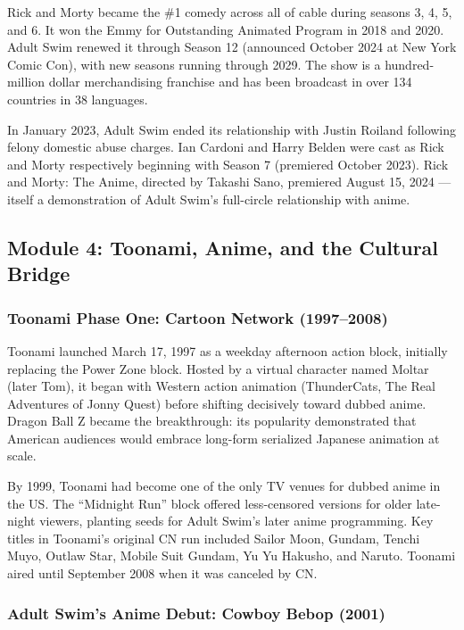 \documentclass[11pt,letterpaper]{article}
\begin{document}
Rick and Morty became the \#1 comedy across all of cable during seasons 3, 4, 5, and 6. It won the Emmy for Outstanding Animated Program in 2018 and 2020. Adult Swim renewed it through Season 12 (announced October 2024 at New York Comic Con), with new seasons running through 2029. The show is a hundred-million dollar merchandising franchise and has been broadcast in over 134 countries in 38 languages.

In January 2023, Adult Swim ended its relationship with Justin Roiland following felony domestic abuse charges. Ian Cardoni and Harry Belden were cast as Rick and Morty respectively beginning with Season 7 (premiered October 2023). Rick and Morty: The Anime, directed by Takashi Sano, premiered August 15, 2024 --- itself a demonstration of Adult Swim's full-circle relationship with anime.

\subsection{Module 4: Toonami, Anime, and the Cultural Bridge}

\subsubsection{Toonami Phase One: Cartoon Network (1997--2008)}

Toonami launched March 17, 1997 as a weekday afternoon action block, initially replacing the Power Zone block. Hosted by a virtual character named Moltar (later Tom), it began with Western action animation (ThunderCats, The Real Adventures of Jonny Quest) before shifting decisively toward dubbed anime. Dragon Ball Z became the breakthrough: its popularity demonstrated that American audiences would embrace long-form serialized Japanese animation at scale.

By 1999, Toonami had become one of the only TV venues for dubbed anime in the US. The ``Midnight Run'' block offered less-censored versions for older late-night viewers, planting seeds for Adult Swim's later anime programming. Key titles in Toonami's original CN run included Sailor Moon, Gundam, Tenchi Muyo, Outlaw Star, Mobile Suit Gundam, Yu Yu Hakusho, and Naruto. Toonami aired until September 2008 when it was canceled by CN.

\subsubsection{Adult Swim's Anime Debut: Cowboy Bebop (2001)}
\end{document}

